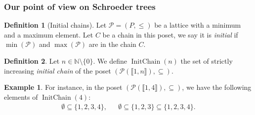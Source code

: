 \documentclass[a4paper,10pt]{amsart}
\DeclareMathOperator{\IC}{InitChain}
\newcommand\nn{n}
\newcommand\NN{\mathbb{N}}
\newcommand{\IEM}[2]{\llbracket #1,#2 \rrbracket}
\newcommand{\Schw}{Schroeder} %
\theoremstyle{definition}
\newtheorem{exam}{Example}
\newtheorem{defi}{Definition}
\begin{document}
\subsubsection{Our point of view on \Schw{} trees}
\begin{defi}[Initial chains] \label{def:init_chain}
	Let $\mathcal{P}=(P,\leq)$ be a lattice with a minimum and a maximum element.
	Let $C$ be a chain in this poset, we say it is \emph{initial} if $\min(\mathcal{P})$ and $\max(\mathcal{P})$ are in the chain $C$.
\end{defi}
\begin{defi}
	Let $n\in\NN\setminus \{0\}$.
	We define $\IC(\nn)$ the set of strictly increasing \emph{initial chain} of the poset $(\mathcal{P}(\IEM{1}{n}),\subseteq)$. 
\end{defi}
\begin{exam}
	For instance, in the poset $(\mathcal{P}(\IEM{1}{4}),\subseteq)$, we have the following elements of $\IC(4)$:
	\begin{align*}
		\emptyset \subseteq \{1,2,3,4\}, &&
		\emptyset \subseteq \{1,2,3\} \subseteq \{1,2,3,4\}.
	\end{align*}
\end{exam}

\end{document}
